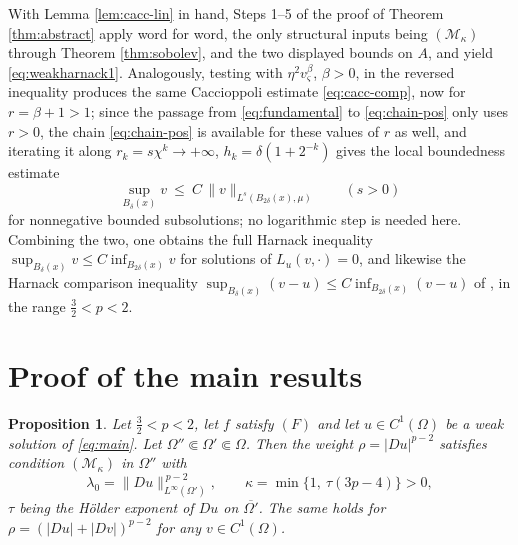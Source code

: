 \documentclass[reqno]{amsart}
\theoremstyle{plain}
\newtheorem{proposition}[theorem]{Proposition}
\theoremstyle{definition}
\theoremstyle{remark}
\begin{document}
With Lemma \ref{lem:cacc-lin} in hand, Steps 1--5 of the proof of Theorem \ref{thm:abstract} apply
word for word, the only structural inputs being $(\mathcal M_\kappa)$ through Theorem
\ref{thm:sobolev}, and the two displayed bounds on $A$, and yield
\eqref{eq:weakharnack1}. Analogously, testing with $\eta^2v_\varsigma^{\beta}$, $\beta>0$, in the
reversed inequality produces the same Caccioppoli estimate \eqref{eq:cacc-comp}, now for
$r=\beta+1>1$; since the passage from \eqref{eq:fundamental} to \eqref{eq:chain-pos} only uses
$r>0$, the chain \eqref{eq:chain-pos} is available for these values of $r$ as well, and iterating it
along $r_k=s\chi^{k}\to+\infty$, $h_k=\delta(1+2^{-k})$ gives the local boundedness estimate
\[
\sup_{B_{\delta}(x)}v\ \le\ C\,\|v\|_{L^{s}(B_{2\delta}(x),\mu)}\qquad (s>0)
\]
for nonnegative bounded subsolutions; no logarithmic step is needed here. Combining the two, one
obtains the full Harnack inequality $\sup_{B_{\delta}(x)}v\le C\inf_{B_{2\delta}(x)}v$ for solutions of
$L_u(v,\cdot)=0$, and likewise the Harnack comparison inequality
$\sup_{B_{\delta}(x)}(v-u)\le C\inf_{B_{2\delta}(x)}(v-u)$ of \cite[Corollary 3.2]{DS2}, in the range
$\frac32<p<2$.

\section{Proof of the main results}\label{sec:proofs}

\begin{proposition}\label{prop:verify}
Let $\frac32<p<2$, let $f$ satisfy $(F)$ and let $u\in C^1(\Omega)$ be a weak solution of
\eqref{eq:main}. Let $\Omega''\Subset\Omega'\Subset\Omega$. Then the weight $\rho=|Du|^{p-2}$
satisfies condition $(\mathcal M_\kappa)$ in $\Omega''$ with
\[
\lambda_0=\|Du\|_{L^\infty(\Omega')}^{\,p-2},\qquad \kappa=\min\{1,\ \tau(3p-4)\}>0 ,
\]
$\tau$ being the H\"older exponent of $Du$ on $\overline{\Omega'}$. The same holds for
$\rho=(|Du|+|Dv|)^{p-2}$ for any $v\in C^1(\Omega)$.
\end{proposition}
\end{document}
